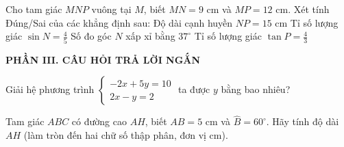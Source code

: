 \documentclass[12pt,a4paper]{article}
\begin{document}
\begin{ex}
Cho tam giác $MNP$ vuông tại $M$, biết $MN = 9\text{ cm}$ và $MP = 12\text{ cm}$. Xét tính Đúng/Sai của các khẳng định sau:
\choiceTF
{\True Độ dài cạnh huyền $NP = 15\text{ cm}$}
{\True Tỉ số lượng giác $\sin N = \frac{4}{5}$}
{Số đo góc $N$ xấp xỉ bằng $37^\circ$}
{Tỉ số lượng giác $\tan P = \frac{4}{3}$}
\end{ex}


\setcounter{ex}{0}
\noindent\textbf{\large PHẦN III. CÂU HỎI TRẢ LỜI NGẮN}
\vspace{1mm}
\begin{ex}
Giải hệ phương trình $\begin{cases} -2x + 5y = 10 \\ 2x - y = 2 \end{cases}$ ta được $y$ bằng bao nhiêu? 
\end{ex}

\begin{ex}
Tam giác $ABC$ có đường cao $AH$, biết $AB = 5\text{ cm}$ và $\widehat{B} = 60^\circ$. Hãy tính độ dài $AH$ (làm tròn đến hai chữ số thập phân, đơn vị cm). 
\end{ex}
\end{document}
